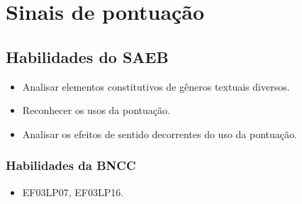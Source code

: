 \chapter{Sinais de pontuação}


\section*{Habilidades do SAEB}

\begin{itemize}
  \item Analisar elementos constitutivos de gêneros textuais diversos.
  \item Reconhecer os usos da pontuação.
  \item Analisar os efeitos de sentido decorrentes do uso da pontuação.
\end{itemize}

\subsection{Habilidades da BNCC}

\begin{itemize}
  \item EF03LP07, EF03LP16.
\end{itemize}



